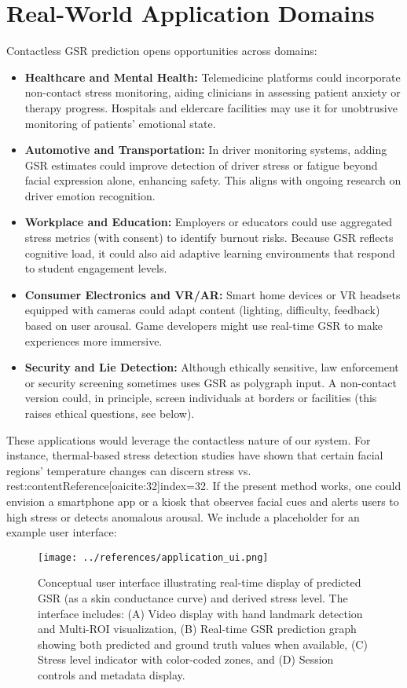     \section{Real-World Application Domains}
    Contactless GSR prediction opens opportunities across domains:
    \begin{itemize}
        \item \textbf{Healthcare and Mental Health:} Telemedicine platforms could incorporate non-contact stress monitoring, aiding clinicians in assessing patient anxiety or therapy progress. Hospitals and eldercare facilities may use it for unobtrusive monitoring of patients’ emotional state.
        \item \textbf{Automotive and Transportation:} In driver monitoring systems, adding GSR estimates could improve detection of driver stress or fatigue beyond facial expression alone, enhancing safety. This aligns with ongoing research on driver emotion recognition.
        \item \textbf{Workplace and Education:} Employers or educators could use aggregated stress metrics (with consent) to identify burnout risks. Because GSR reflects cognitive load, it could also aid adaptive learning environments that respond to student engagement levels.
        \item \textbf{Consumer Electronics and VR/AR:} Smart home devices or VR headsets equipped with cameras could adapt content (lighting, difficulty, feedback) based on user arousal. Game developers might use real-time GSR to make experiences more immersive.
        \item \textbf{Security and Lie Detection:} Although ethically sensitive, law enforcement or security screening sometimes uses GSR as polygraph input. A non-contact version could, in principle, screen individuals at borders or facilities (this raises ethical questions, see below).
    \end{itemize}
    These applications would leverage the contactless nature of our system. For instance, thermal-based stress detection studies have shown that certain facial regions’ temperature changes can discern stress vs. rest:contentReference[oaicite:32]{index=32}. If the present method works, one could envision a smartphone app or a kiosk that observes facial cues and alerts users to high stress or detects anomalous arousal. We include a placeholder for an example user interface:
    \begin{figure}[ht]
        \centering
        \texttt{[image: ../references/application\_ui.png]}
        \caption{Conceptual user interface illustrating real-time display of predicted GSR (as a skin conductance curve) and derived stress level. The interface includes: (A) Video display with hand landmark detection and Multi-ROI visualization, (B) Real-time GSR prediction graph showing both predicted and ground truth values when available, (C) Stress level indicator with color-coded zones, and (D) Session controls and metadata display.}
        \label{fig:ui}
    \end{figure}
